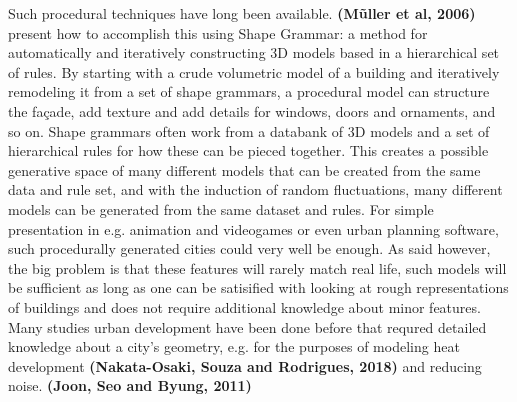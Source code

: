 \documentclass{kththesis}
\begin{document}
Such procedural techniques have long been available.
\textbf{(Mũller et al, 2006)} present how to accomplish this using Shape Grammar: a method for automatically and iteratively constructing 3D models based in a hierarchical set of rules.
By starting with a crude volumetric model of a building and iteratively remodeling it from a set of shape grammars, a procedural model can structure the façade, add texture and add details for windows, doors and ornaments, and so on.
Shape grammars often work from a databank of 3D models and a set of hierarchical rules for how these can be pieced together.
This creates a possible generative space of many different models that can be created from the same data and rule set, and with the induction of random fluctuations, many different models can be generated from the same dataset and rules.
For simple presentation in e.g. animation and videogames or even urban planning software, such procedurally generated cities could very well be enough.
As said however, the big problem is that these features will rarely match real life, such models will be sufficient as long as one can be satisified with looking at rough representations of buildings and does not require additional knowledge about minor features.
Many studies urban development have been done before that requred detailed knowledge about a city's geometry, e.g. for the purposes of modeling heat development
\textbf{(Nakata-Osaki, Souza and Rodrigues, 2018)}
and reducing noise.
\textbf{(Joon, Seo and Byung, 2011)}
\end{document}
